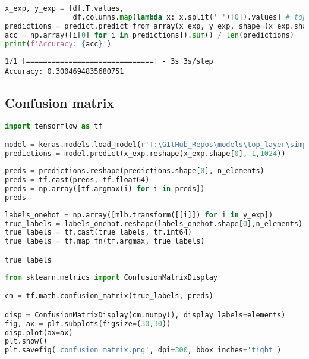 \begin{lstlisting}[language=Python]
x_exp, y_exp = [df.T.values,
                df.columns.map(lambda x: x.split('_')[0]).values] # top layer
predictions = predict.predict_from_array(x_exp, y_exp, shape=(x_exp.shape[0], 1024,1), model=vit)
acc = np.array([i[0] for i in predictions]).sum() / len(predictions)
print(f'Accuracy: {acc}')
\end{lstlisting}

\begin{lstlisting}
1/1 [==============================] - 3s 3s/step
Accuracy: 0.3004694835680751
\end{lstlisting}

\hypertarget{confusion-matrix}{%
\subsection{Confusion matrix}\label{confusion-matrix}}

\begin{lstlisting}[language=Python]
import tensorflow as tf

model = keras.models.load_model(r'T:\GItHub_Repos\models\top_layer\simple_cnn_dct_top_layer.h5')
predictions = model.predict(x_exp.reshape(x_exp.shape[0], 1,1024))
\end{lstlisting}

\begin{lstlisting}[language=Python]
preds = predictions.reshape(predictions.shape[0], n_elements)
preds = tf.cast(preds, tf.float64)
preds = np.array([tf.argmax(i) for i in preds])
preds
\end{lstlisting}

\begin{lstlisting}[language=Python]
labels_onehot = np.array([mlb.transform([[i]]) for i in y_exp])
true_labels = labels_onehot.reshape(labels_onehot.shape[0],n_elements)
true_labels = tf.cast(true_labels, tf.int64)
true_labels = tf.map_fn(tf.argmax, true_labels)

true_labels
\end{lstlisting}

\begin{lstlisting}[language=Python]
from sklearn.metrics import ConfusionMatrixDisplay

cm = tf.math.confusion_matrix(true_labels, preds)

disp = ConfusionMatrixDisplay(cm.numpy(), display_labels=elements)
fig, ax = plt.subplots(figsize=(30,30))
disp.plot(ax=ax)
plt.show()
plt.savefig('confusion_matrix.png', dpi=300, bbox_inches='tight')
\end{lstlisting}
